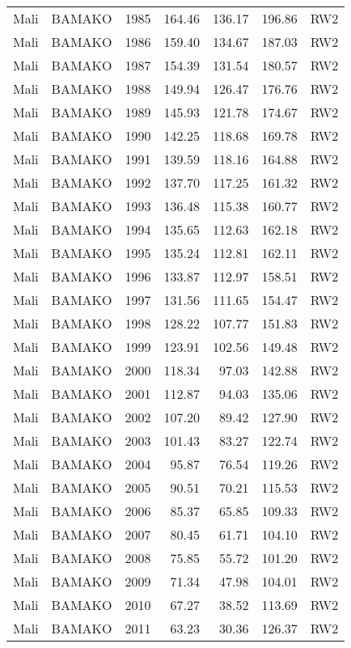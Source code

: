 \begin{longtable}{lllrrrl}
  Mali & BAMAKO & 1985 & 164.46 & 136.17 & 196.86 & RW2 \\ 
  Mali & BAMAKO & 1986 & 159.40 & 134.67 & 187.03 & RW2 \\ 
  Mali & BAMAKO & 1987 & 154.39 & 131.54 & 180.57 & RW2 \\ 
  Mali & BAMAKO & 1988 & 149.94 & 126.47 & 176.76 & RW2 \\ 
  Mali & BAMAKO & 1989 & 145.93 & 121.78 & 174.67 & RW2 \\ 
  Mali & BAMAKO & 1990 & 142.25 & 118.68 & 169.78 & RW2 \\ 
  Mali & BAMAKO & 1991 & 139.59 & 118.16 & 164.88 & RW2 \\ 
  Mali & BAMAKO & 1992 & 137.70 & 117.25 & 161.32 & RW2 \\ 
  Mali & BAMAKO & 1993 & 136.48 & 115.38 & 160.77 & RW2 \\ 
  Mali & BAMAKO & 1994 & 135.65 & 112.63 & 162.18 & RW2 \\ 
  Mali & BAMAKO & 1995 & 135.24 & 112.81 & 162.11 & RW2 \\ 
  Mali & BAMAKO & 1996 & 133.87 & 112.97 & 158.51 & RW2 \\ 
  Mali & BAMAKO & 1997 & 131.56 & 111.65 & 154.47 & RW2 \\ 
  Mali & BAMAKO & 1998 & 128.22 & 107.77 & 151.83 & RW2 \\ 
  Mali & BAMAKO & 1999 & 123.91 & 102.56 & 149.48 & RW2 \\ 
  Mali & BAMAKO & 2000 & 118.34 & 97.03 & 142.88 & RW2 \\ 
  Mali & BAMAKO & 2001 & 112.87 & 94.03 & 135.06 & RW2 \\ 
  Mali & BAMAKO & 2002 & 107.20 & 89.42 & 127.90 & RW2 \\ 
  Mali & BAMAKO & 2003 & 101.43 & 83.27 & 122.74 & RW2 \\ 
  Mali & BAMAKO & 2004 & 95.87 & 76.54 & 119.26 & RW2 \\ 
  Mali & BAMAKO & 2005 & 90.51 & 70.21 & 115.53 & RW2 \\ 
  Mali & BAMAKO & 2006 & 85.37 & 65.85 & 109.33 & RW2 \\ 
  Mali & BAMAKO & 2007 & 80.45 & 61.71 & 104.10 & RW2 \\ 
  Mali & BAMAKO & 2008 & 75.85 & 55.72 & 101.20 & RW2 \\ 
  Mali & BAMAKO & 2009 & 71.34 & 47.98 & 104.01 & RW2 \\ 
  Mali & BAMAKO & 2010 & 67.27 & 38.52 & 113.69 & RW2 \\ 
  Mali & BAMAKO & 2011 & 63.23 & 30.36 & 126.37 & RW2 \\ 

\end{longtable}
